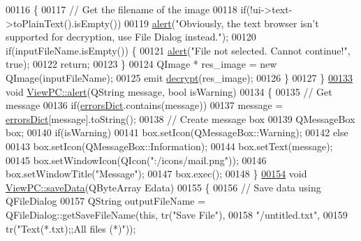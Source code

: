 \begin{DoxyCode}
00116     \{
00117         \textcolor{comment}{// Get the filename of the image}
00118         \textcolor{keywordflow}{if}(!ui->text->toPlainText().isEmpty())
00119             \mbox{\hyperlink{class_view_p_c_a7c467169467789561078abc9d4fe57bd}{alert}}(\textcolor{stringliteral}{"Obviously, the text browser isn't supported for decryption, use File Dialog
       instead."});
00120         \textcolor{keywordflow}{if}(inputFileName.isEmpty()) \{
00121             \mbox{\hyperlink{class_view_p_c_a7c467169467789561078abc9d4fe57bd}{alert}}(\textcolor{stringliteral}{"File not selected. Cannot continue!"}, \textcolor{keyword}{true});
00122             \textcolor{keywordflow}{return};
00123         \}
00124         QImage * res\_image = \textcolor{keyword}{new} QImage(inputFileName);
00125         emit \mbox{\hyperlink{class_view_p_c_acf8feb98f757cc238dada1df2308e303}{decrypt}}(res\_image);
00126     \}
00127 \}
\mbox{\hyperlink{class_view_p_c_a7c467169467789561078abc9d4fe57bd}{00133}} \textcolor{keywordtype}{void} \mbox{\hyperlink{class_view_p_c_a7c467169467789561078abc9d4fe57bd}{ViewPC::alert}}(QString message, \textcolor{keywordtype}{bool} isWarning)
00134 \{
00135     \textcolor{comment}{// Get message}
00136     \textcolor{keywordflow}{if}(\mbox{\hyperlink{class_view_p_c_a26f90436aca32e5bad46f5e69a7e7e09}{errorsDict}}.contains(message))
00137         message = \mbox{\hyperlink{class_view_p_c_a26f90436aca32e5bad46f5e69a7e7e09}{errorsDict}}[message].toString();
00138     \textcolor{comment}{// Create message box}
00139     QMessageBox box;
00140     \textcolor{keywordflow}{if}(isWarning)
00141         box.setIcon(QMessageBox::Warning);
00142     \textcolor{keywordflow}{else}
00143         box.setIcon(QMessageBox::Information);
00144     box.setText(message);
00145     box.setWindowIcon(QIcon(\textcolor{stringliteral}{":/icons/mail.png"}));
00146     box.setWindowTitle(\textcolor{stringliteral}{"Message"});
00147     box.exec();
00148 \}
\mbox{\hyperlink{class_view_p_c_aaff156103970be7c777beedaf0020604}{00154}} \textcolor{keywordtype}{void} \mbox{\hyperlink{class_view_p_c_aaff156103970be7c777beedaf0020604}{ViewPC::saveData}}(QByteArray Edata)
00155 \{
00156     \textcolor{comment}{// Save data using QFileDialog}
00157     QString outputFileName = QFileDialog::getSaveFileName(\textcolor{keyword}{this}, tr(\textcolor{stringliteral}{"Save File"}),
00158                                \textcolor{stringliteral}{"/untitled.txt"},
00159                                tr(\textcolor{stringliteral}{"Text(*.txt);;All files (*)"}));

\end{DoxyCode}
